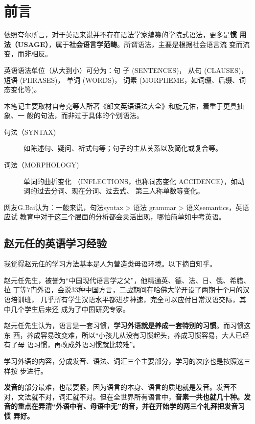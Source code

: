 \chapter{前言}

依照夸尔所言，对于英语来说并不存在语法学家编纂的学院式语法，更多是\textbf{惯
  用法（USAGE）}，属于\textbf{社会语言学范畴}。所谓语法，主要是根据社会语言流
变而流变，而非相反。

英语语法单位（从大到小）可分为：句
子 (SENTENCES)， 从句 (CLAUSES)， 短语 (PHRASES)， 单词 (WORDS)， 词素
(MORPHEME，如词缀、后缀、词态变化等)。

本笔记主要取材自夸克等人所著《郎文英语语法大全》和旋元佑，着重于更具抽象、一
般的句法，而非过于具体的个别语法。


\begin{description}
\item [句法（SYNTAX)] 如陈述句、疑问、祈式句等；句子的主从关系以及简化或复合等。
\item [词法（MORPHOLOGY)] 单词的曲折变化
  （INFLECTIONS，也称词态变化 ACCIDENCE），如动词的过去分词、现在分词、过去式、
  第三人称单数等变化。
\end{description}

网友G.Bai认为：一般来说，句法syntax > 语法 grammar > 语义semantics，英语应试
教育中对于这三个层面的分析都会灵活出现，哪怕简单如中考英语。

\section{赵元任的英语学习经验}

我觉得赵元任的学习方法基本是人为营造类母语环境。以下摘自知乎。

赵元任先生，被誉为“中国现代语言学之父”，他精通英、德、法、日、俄、希腊、拉
丁等7门外语，会说33种中国方言，二战期间在哈佛大学开设了两期十个月的汉语培训班，
几乎所有学生汉语水平都进步神速，完全可以应付日常汉语交际，其中几个学生后来还
成为了中国研究专家。

赵元任先生认为，语言是一套习惯，\textbf{学习外语就是养成一套特别的习惯}。而习惯这东
西，养成容易改变难，所以“小孩儿从没有习惯起头，养成习惯容易，大人已经有了母
语习惯，再改成外语习惯就比较难”。

学习外语的内容，分成发音、语法、词汇三个主要部分，学习的次序也是按照这三样按
步进行。

\textbf{发音}的部分最难，也最要紧，因为语言的本身、语言的质地就是发音。发音不
对，文法就不对，词汇就不对。但在全世界所有语言中，\textbf{音素一共也就几十种。}\textbf{发
  音的重点在弄清“外语中有、母语中无”的音，并在开始学的两三个礼拜把发音习惯
  弄好。}

